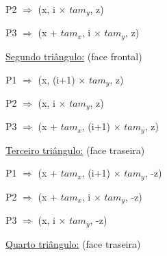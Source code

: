 \documentclass[a4paper]{article}
\begin{document}
\begin{enumerate}
\begin{enumerate}
\begin{enumerate}
      \vspace{0.2cm}

          \hspace{0.5cm} P2 $\Rightarrow$ (x, i $\times$ $tam_{y}$, z)

      \vspace{0.2cm}

          \hspace{0.5cm} P3 $\Rightarrow$ (x + $tam_{x}$, i $\times$ $tam_{y}$, z)

      \vspace{0.5cm}

      \underline{Segundo triângulo:} (face frontal)

      \vspace{0.5cm}

          \hspace{0.5cm} P1 $\Rightarrow$ (x, (i+1) $\times$ $tam_{y}$, z)

      \vspace{0.2cm}

          \hspace{0.5cm} P2 $\Rightarrow$ (x, i $\times$ $tam_{y}$, z)

      \vspace{0.2cm}

          \hspace{0.5cm} P3 $\Rightarrow$ (x + $tam_{x}$, (i+1) $\times$ $tam_{y}$, z)

      \vspace{0.5cm}

      \underline{Terceiro triângulo:} (face traseira)

      \vspace{0.5cm}

          \hspace{0.5cm} P1 $\Rightarrow$ (x + $tam_{x}$, (i+1) $\times$ $tam_{y}$, -z)

      \vspace{0.2cm}

          \hspace{0.5cm} P2 $\Rightarrow$ (x + $tam_{x}$, i $\times$ $tam_{y}$, -z)

      \vspace{0.2cm}

          \hspace{0.5cm} P3 $\Rightarrow$ (x, i $\times$ $tam_{y}$, -z)

      \vspace{0.5cm}

      \underline{Quarto triângulo:} (face traseira)


\end{enumerate}
\end{enumerate}
\end{enumerate}
\end{document}
